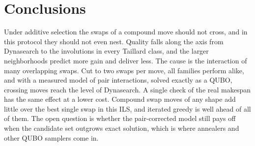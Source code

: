 \documentclass[10pt,twocolumn]{article}
\begin{document}
\section{Conclusions}
Under additive selection the swaps of a compound move should not
cross, and in this protocol they should not even nest. Quality falls
along the axis from Dynasearch to the involutions in every Taillard
class, and the larger neighborhoods predict more gain and deliver less.
The cause is the interaction of many overlapping swaps. Cut to two
swaps per move, all families perform alike, and with a measured model of
pair interactions, solved exactly as a QUBO, crossing moves reach the
level of Dynasearch. A single check of the real makespan has the same
effect at a lower cost. Compound swap moves of any shape add little over
the best single swap in this ILS, and iterated greedy is well ahead of
all of them. The open question is whether the pair-corrected model still
pays off when the candidate set outgrows exact solution, which is where
annealers and other QUBO samplers come in.
\end{document}
